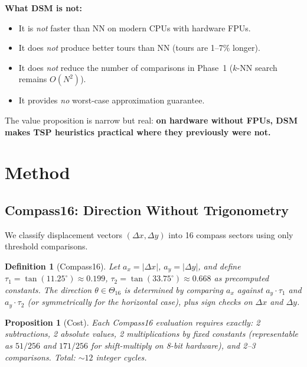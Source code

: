 \documentclass[11pt,a4paper,twocolumn]{article}
\newcommand{\degree}{^{\circ}}
\newtheorem{definition}{Definition}
\newtheorem{proposition}{Proposition}
\begin{document}
\textbf{What DSM is not:}
\begin{itemize}[leftmargin=*,itemsep=1pt]
\item It is \textit{not} faster than NN on modern CPUs with hardware FPUs.
\item It does \textit{not} produce better tours than NN (tours are 1--7\% longer).
\item It does \textit{not} reduce the number of comparisons in Phase~1 ($k$-NN search remains $O(N^2)$).
\item It provides \textit{no} worst-case approximation guarantee.
\end{itemize}

The value proposition is narrow but real: \textbf{on hardware without FPUs, DSM makes TSP heuristics practical where they previously were not.}

\section{Method}\label{sec:method}

\subsection{Compass16: Direction Without Trigonometry}\label{sec:compass}

We classify displacement vectors $(\Delta x, \Delta y)$ into 16 compass sectors using only threshold comparisons.

\begin{definition}[Compass16]
Let $a_x{=}|\Delta x|$, $a_y{=}|\Delta y|$, and define $\tau_1{=}\tan(11.25\degree){\approx}0.199$, $\tau_2{=}\tan(33.75\degree){\approx}0.668$ as precomputed constants. The direction $\theta\in\Theta_{16}$ is determined by comparing $a_x$ against $a_y{\cdot}\tau_1$ and $a_y{\cdot}\tau_2$ (or symmetrically for the horizontal case), plus sign checks on $\Delta x$ and $\Delta y$.
\end{definition}

\begin{proposition}[Cost]
Each Compass16 evaluation requires exactly: 2 subtractions, 2 absolute values, 2 multiplications by fixed constants (representable as $51/256$ and $171/256$ for shift-multiply on 8-bit hardware), and 2--3 comparisons. Total: ${\sim}12$ integer cycles.
\end{proposition}
\end{document}
